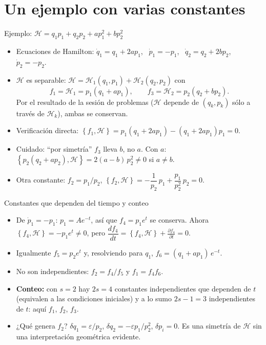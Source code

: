 \documentclass[spanish]{beamer}
\newcommand{\Ham}{\mathcal{H}}
\newcommand{\pd}[2]{\frac{\partial #1}{\partial #2}}
\newcommand{\pb}[2]{\left\{#1,#2\right\}}   %
\begin{document}
\section{Un ejemplo con varias constantes}

\begin{frame}{Ejemplo: $\Ham = q_1p_1 + q_2p_2 + ap_1^2 + bp_2^2$}
\begin{itemize}
  \item<1-> Ecuaciones de Hamilton:
        $\dot q_1 = q_1 + 2ap_1$, \ $\dot p_1 = -p_1$, \
        $\dot q_2 = q_2 + 2bp_2$, \ $\dot p_2 = -p_2$.
  \item<2-> $\Ham$ es separable: $\Ham = \Ham_1(q_1,p_1) + \Ham_2(q_2,p_2)$ con
  \[
    f_1 = \Ham_1 = p_1(q_1 + ap_1), \qquad f_3 = \Ham_2 = p_2(q_2 + bp_2) .
  \]
  Por el resultado de la sesión de problemas ($\Ham$ depende de $(q_k,p_k)$ sólo a
  través de $\Ham_k$), ambas se conservan.
  \item<3-> Verificación directa:
        $\pb{f_1}{\Ham} = p_1(q_1+2ap_1) - (q_1+2ap_1)p_1 = 0$.
  \item<4-> \alert{Cuidado:} ``por simetría'' $f_3$ lleva $b$, no $a$. Con $a$:
        $\pb{p_2(q_2+ap_2)}{\Ham} = 2(a-b)\,p_2^2\neq 0$ si $a\neq b$.
  \item<5-> Otra constante: $f_2 = p_1/p_2$,
  \(
    \pb{f_2}{\Ham} = -\dfrac{1}{p_2}\,p_1 + \dfrac{p_1}{p_2^2}\,p_2 = 0 .
  \)
\end{itemize}
\end{frame}

\begin{frame}{Constantes que dependen del tiempo y conteo}
\begin{itemize}
  \item<1-> De $\dot p_1 = -p_1$: $p_1 = A e^{-t}$, así que $f_4 = p_1e^{t}$ se conserva.
        Ahora $\pb{f_4}{\Ham} = -p_1e^{t}\neq 0$, pero
        $\dfrac{df_4}{dt} = \pb{f_4}{\Ham} + \pd{f_4}{t} = 0$.
  \item<2-> Igualmente $f_5 = p_2e^{t}$ y, resolviendo para $q_1$,
        $f_6 = (q_1 + ap_1)\,e^{-t}$.
  \item<3-> No son independientes: $f_2 = f_4/f_5$ y $f_1 = f_4 f_6$.
  \item<4-> \textbf{Conteo:} con $s=2$ hay $2s = 4$ constantes independientes que
        dependen de $t$ (equivalen a las condiciones iniciales) y a lo sumo
        $2s-1 = 3$ independientes de $t$: aquí $f_1$, $f_2$, $f_3$.
  \item<5-> ¿Qué genera $f_2$? $\delta q_1 = \varepsilon/p_2$,
        $\delta q_2 = -\varepsilon p_1/p_2^2$, $\delta p_i = 0$. Es una simetría
        de $\Ham$ sin una interpretación geométrica evidente.
\end{itemize}
\end{frame}
\end{document}
